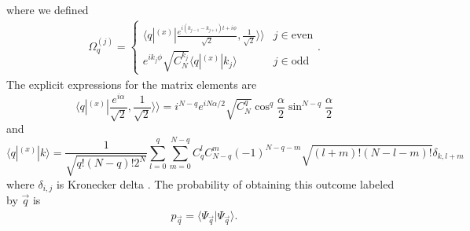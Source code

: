 \documentclass{WileyMSP-template}
\newcommand{\ket}[1]{\left|#1\right\rangle}
\newcommand{\kett}[1]{\left.\left|#1\right\rangle\!\right\rangle}
\newcommand{\braket}[2]{\left.\left\langle #1\right| #2 \right\rangle}
\begin{document}
%
where we defined
%
\begin{align}
\Omega_{q}^{(j)} = \left\{
\begin{array}{cc}
\langle q |^{(x)} | \frac{e^{i(k_{j-1} - k_{j+1})t + i \phi }}{\sqrt{2}},\frac{1}{\sqrt{2}}\rangle\rangle
 & j \in \text{even} \\
e^{i k_j \phi} \sqrt{ C^{k_j}_{N} } \langle q|^{(x)} | k_j \rangle &  j \in \text{odd}
\end{array}
\right.   .
\end{align}
%
The explicit expressions for the matrix elements are
%
\begin{equation}
\langle q |^{(x)} | \frac{e^{i\alpha}}{\sqrt{2}},\frac{1}{\sqrt{2}}\rangle\rangle = i^{N-q} e^{i N  \alpha /2} \sqrt{C_N^{q}}\cos^{q} \frac{\alpha}{2} \sin^{N-q} \frac{\alpha}{2}
\end{equation}
%
and
%
\begin{equation}
\langle q|^{(x)} | k\rangle=\frac{1}{\sqrt{q!(N-q)!2^N}}\sum^q_{l=0}\sum^{N-q}_{m=0}C^l_q C^m_{N-q}
(-1)^{N-q-m}\sqrt{(l+m)!(N-l-m)!}\delta_{k,l+m}
\end{equation}
%
where $\delta_{i,j}$ is Kronecker delta \cite{byrnes2020quantum}. The probability of obtaining this outcome labeled by $ \vec{q} $ is
%
\begin{align}
p_{\vec{q}} = \langle \Psi_{\vec{q}} | \Psi_{\vec{q}} \rangle .
\end{align}







\end{document}
